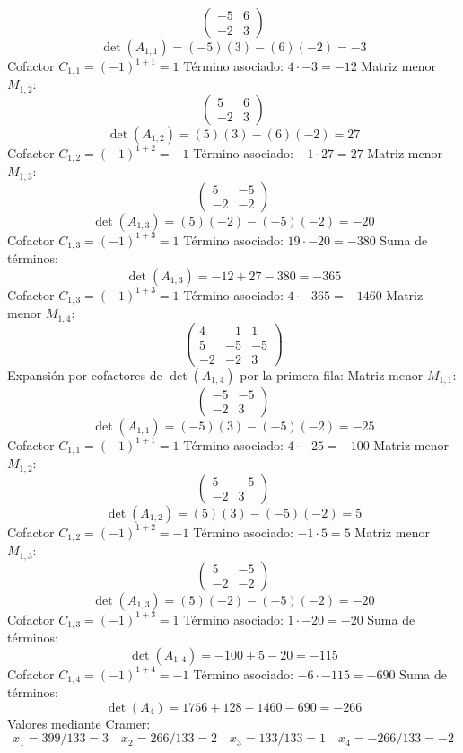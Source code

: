 \documentclass{article}
\begin{document}
\[\begin{pmatrix}-5 & 6 \\ -2 & 3\end{pmatrix}\]
\[\det(A_{1,1}) = (-5)(3) - (6)(-2) = -3\]
Cofactor $C_{1,1} = (-1)^{1+1} = 1$
Término asociado: $ 4 \cdot -3 = -12 $
Matriz menor $M_{1,2}$:
\[\begin{pmatrix}5 & 6 \\ -2 & 3\end{pmatrix}\]
\[\det(A_{1,2}) = (5)(3) - (6)(-2) = 27\]
Cofactor $C_{1,2} = (-1)^{1+2} = -1$
Término asociado: $ -1 \cdot 27 = 27 $
Matriz menor $M_{1,3}$:
\[\begin{pmatrix}5 & -5 \\ -2 & -2\end{pmatrix}\]
\[\det(A_{1,3}) = (5)(-2) - (-5)(-2) = -20\]
Cofactor $C_{1,3} = (-1)^{1+3} = 1$
Término asociado: $ 19 \cdot -20 = -380 $
Suma de términos:
\[\det(A_{1,3}) = -12 + 27 - 380 = -365\]
Cofactor $C_{1,3} = (-1)^{1+3} = 1$
Término asociado: $ 4 \cdot -365 = -1460 $
Matriz menor $M_{1,4}$:
\[\begin{pmatrix}4 & -1 & 1 \\ 5 & -5 & -5 \\ -2 & -2 & 3\end{pmatrix}\]
Expansión por cofactores de $\det(A_{1,4})$ por la primera fila:
Matriz menor $M_{1,1}$:
\[\begin{pmatrix}-5 & -5 \\ -2 & 3\end{pmatrix}\]
\[\det(A_{1,1}) = (-5)(3) - (-5)(-2) = -25\]
Cofactor $C_{1,1} = (-1)^{1+1} = 1$
Término asociado: $ 4 \cdot -25 = -100 $
Matriz menor $M_{1,2}$:
\[\begin{pmatrix}5 & -5 \\ -2 & 3\end{pmatrix}\]
\[\det(A_{1,2}) = (5)(3) - (-5)(-2) = 5\]
Cofactor $C_{1,2} = (-1)^{1+2} = -1$
Término asociado: $ -1 \cdot 5 = 5 $
Matriz menor $M_{1,3}$:
\[\begin{pmatrix}5 & -5 \\ -2 & -2\end{pmatrix}\]
\[\det(A_{1,3}) = (5)(-2) - (-5)(-2) = -20\]
Cofactor $C_{1,3} = (-1)^{1+3} = 1$
Término asociado: $ 1 \cdot -20 = -20 $
Suma de términos:
\[\det(A_{1,4}) = -100 + 5 - 20 = -115\]
Cofactor $C_{1,4} = (-1)^{1+4} = -1$
Término asociado: $ -6 \cdot -115 = -690 $
Suma de términos:
\[\det(A_{4}) = 1756 + 128 - 1460 - 690 = -266\]
Valores mediante Cramer:
\[x_1 = 399/133 = 3\quad x_2 = 266/133 = 2\quad x_3 = 133/133 = 1\quad x_4 = -266/133 = -2\]
\end{document}
